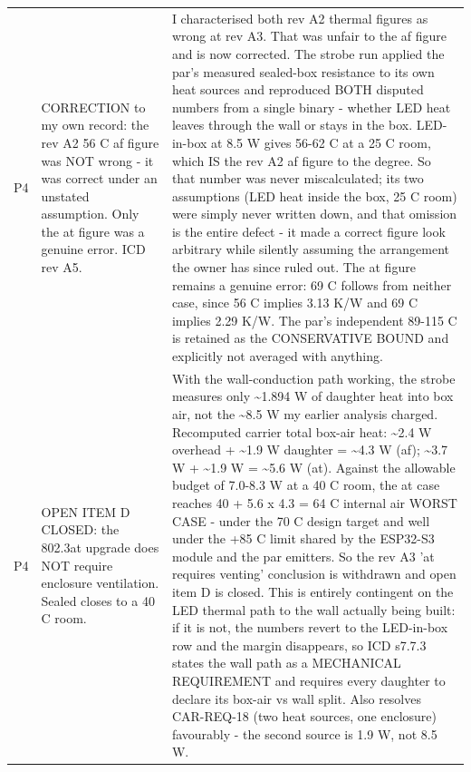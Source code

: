 \documentclass[11pt,a4paper]{article}
\begin{document}
{\begin{longtable}{lp{5.2cm}p{7.2cm}}
P4 & CORRECTION to my own record: the rev A2 56 C af figure was NOT wrong - it was correct under an unstated assumption. Only the at figure was a genuine error. ICD rev A5. & I characterised both rev A2 thermal figures as wrong at rev A3. That was unfair to the af figure and is now corrected. The strobe run applied the par's measured sealed-box resistance to its own heat sources and reproduced BOTH disputed numbers from a single binary - whether LED heat leaves through the wall or stays in the box. LED-in-box at 8.5 W gives 56-62 C at a 25 C room, which IS the rev A2 af figure to the degree. So that number was never miscalculated; its two assumptions (LED heat inside the box, 25 C room) were simply never written down, and that omission is the entire defect - it made a correct figure look arbitrary while silently assuming the arrangement the owner has since ruled out. The at figure remains a genuine error: 69 C follows from neither case, since 56 C implies 3.13 K/W and 69 C implies 2.29 K/W. The par's independent 89-115 C is retained as the CONSERVATIVE BOUND and explicitly not averaged with anything. \\
P4 & OPEN ITEM D CLOSED: the 802.3at upgrade does NOT require enclosure ventilation. Sealed closes to a 40 C room. & With the wall-conduction path working, the strobe measures only \textasciitilde{}1.894 W of daughter heat into box air, not the \textasciitilde{}8.5 W my earlier analysis charged. Recomputed carrier total box-air heat: \textasciitilde{}2.4 W overhead + \textasciitilde{}1.9 W daughter = \textasciitilde{}4.3 W (af); \textasciitilde{}3.7 W + \textasciitilde{}1.9 W = \textasciitilde{}5.6 W (at). Against the allowable budget of 7.0-8.3 W at a 40 C room, the at case reaches 40 + 5.6 x 4.3 = 64 C internal air WORST CASE - under the 70 C design target and well under the +85 C limit shared by the ESP32-S3 module and the par emitters. So the rev A3 'at requires venting' conclusion is withdrawn and open item D is closed. This is entirely contingent on the LED thermal path to the wall actually being built: if it is not, the numbers revert to the LED-in-box row and the margin disappears, so ICD s7.7.3 states the wall path as a MECHANICAL REQUIREMENT and requires every daughter to declare its box-air vs wall split. Also resolves CAR-REQ-18 (two heat sources, one enclosure) favourably - the second source is 1.9 W, not 8.5 W. \\

\end{longtable}}
\end{document}
